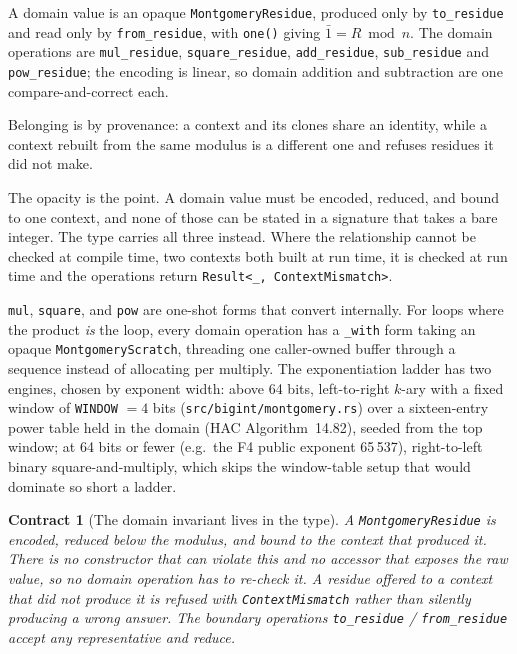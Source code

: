 \documentclass[11pt]{article}
\newtheorem{contract}{Contract}[section]
\newcommand{\code}[1]{\texttt{#1}}
\begin{document}
A domain value is an opaque \code{MontgomeryResidue}, produced only by
\code{to\_residue} and read only by \code{from\_residue}, with \code{one()}
giving $\bar 1 = R \bmod n$. The domain operations are \code{mul\_residue},
\code{square\_residue}, \code{add\_residue}, \code{sub\_residue} and
\code{pow\_residue}; the encoding is linear, so domain addition and
subtraction are one compare-and-correct each.

Belonging is by provenance: a context and its clones share an identity, while
a context rebuilt from the same modulus is a different one and refuses
residues it did not make.

The opacity is the point. A domain value must be encoded, reduced, and bound
to one context, and none of those can be stated in a signature that takes a
bare integer. The type carries all three instead. Where the
relationship cannot be checked at compile time, two contexts both built at run
time, it is checked at run time and the operations return
\code{Result<\_, ContextMismatch>}.

\code{mul}, \code{square}, and \code{pow} are one-shot forms that convert
internally. For loops where the product \emph{is} the loop, every domain
operation has a \code{\_with} form taking an opaque
\code{MontgomeryScratch}, threading one caller-owned buffer through a
sequence instead of allocating per multiply. The exponentiation
ladder has two engines, chosen by exponent width: above 64 bits, left-to-right
$k$-ary with a fixed window of \code{WINDOW} $= 4$ bits
(\code{src/bigint/montgomery.rs}) over a sixteen-entry power table held in
the domain (HAC Algorithm~14.82), seeded from the top window; at 64 bits or
fewer (e.g.\ the F4 public exponent 65\,537), right-to-left binary
square-and-multiply, which skips the window-table setup that would dominate
so short a ladder.

\begin{contract}[The domain invariant lives in the type]
A \code{MontgomeryResidue} is encoded, reduced below the modulus, and bound to
the context that produced it. There is no constructor that can violate this
and no accessor that exposes the raw value, so no domain operation has to
re-check it. A residue offered to a context that did not produce it is
refused with \code{ContextMismatch} rather than silently producing a wrong
answer. The boundary operations \code{to\_residue} / \code{from\_residue}
accept any representative and reduce.
\end{contract}
\end{document}
